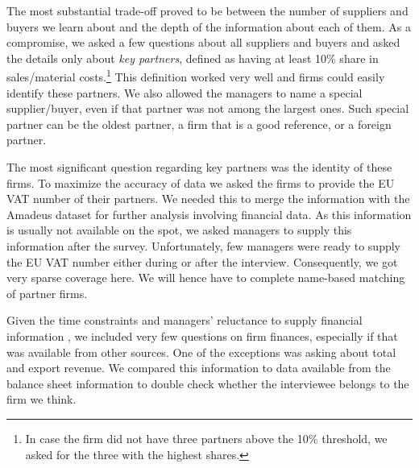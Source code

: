 \documentclass[final, dvipsnames, authoryear,12pt]{elsarticle}
\begin{document}

The most substantial trade-off proved to be between the number of suppliers and buyers we learn about and the depth of the information about each of them. As a compromise, we asked a few questions about all suppliers and buyers and asked the details only about \textit{key partners}, defined as having at least 10\% share in sales/material costs.\footnote{In case the firm did not have three partners above the 10\% threshold, we asked for the three with the highest shares.} This definition worked very well and firms could easily identify these partners. We also allowed the managers to name a special supplier/buyer, even if that partner was not among the largest ones. Such special partner can be the oldest partner, a firm that is a good reference, or a foreign partner.

The most significant question regarding key partners was the identity of these firms. To maximize the accuracy of data we asked the firms to provide the EU VAT number of their partners. We needed this to merge the information with the Amadeus dataset for further analysis involving financial data. As this information is usually not available on the spot, we asked managers to supply this information after the survey. Unfortunately, few managers were ready to supply the EU VAT number either during or after the interview. Consequently, we got very sparse coverage here. We will hence have to complete name-based matching of partner firms.

Given the time constraints and managers' reluctance to supply financial information \citep{Bloom2014-hc}, we included very few questions on firm finances, especially if that was available from other sources. One of the exceptions was asking about total and export revenue. We compared this information to data available from the balance sheet information to double check whether the interviewee belongs to the firm we think. 

\end{document}

